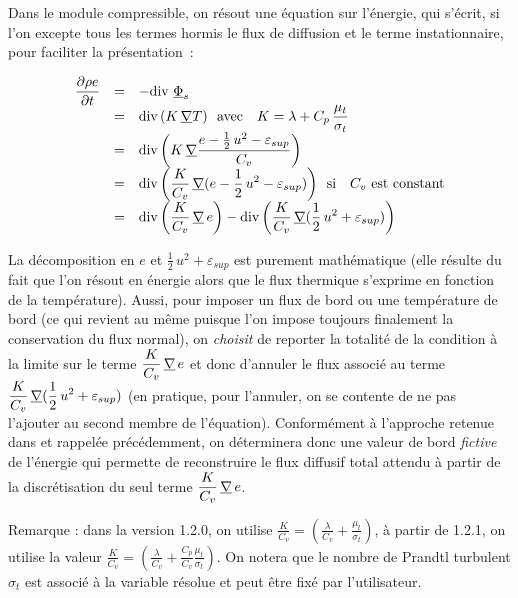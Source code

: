 Dans le module compressible, on résout une équation sur l'énergie, qui s'écrit, si
l'on excepte tous les termes hormis le flux de diffusion et le terme
instationnaire, pour faciliter la présentation~:

\begin{equation}
\begin{array}{lll}
\displaystyle\frac{\partial \rho e}{\partial t} &=& - \text{div}\,{\,\underline{\Phi}_s}\\
&=& \displaystyle\text{div}\,{(K\,\underline{\nabla}{T})} \text{\ \ avec \ \ } K=\lambda+C_p\,\frac{\mu_t}{\sigma_t}\\
&=& \displaystyle\text{div}\,{\left(K\,\underline{\nabla}{\frac{e-\frac{1}{2}\,u^2-\varepsilon_{sup}}{C_v}}\right)} \\
&=& \displaystyle\text{div}\,{\left(\frac{K}{C_v}\,\underline{\nabla}{(e-\frac{1}{2}\,u^2-\varepsilon_{sup})}\right)} \text{\ \
si \ \ } C_v \text{\ est constant}\\
&=& \displaystyle\text{div}\,{\left(\frac{K}{C_v}\,\underline{\nabla}\,e\right)}
-\text{div}\,{\left(\frac{K}{C_v}\,\underline{\nabla}{(\frac{1}{2}\,u^2+\varepsilon_{sup})}\right)} \\

\end{array}
\end{equation}

La décomposition en $e$ et $\frac{1}{2}\,u^2+\varepsilon_{sup}$ est purement
mathématique (elle résulte du fait que l'on résout en énergie alors que
le flux thermique s'exprime en fonction de la température). Aussi,  pour imposer un
flux de bord ou une température de bord (ce qui revient au même puisque l'on
impose toujours finalement la conservation du flux normal), on {\it choisit}
de reporter la totalité de la condition à la limite sur le terme
$\displaystyle\frac{K}{C_v}\,\underline{\nabla}\,e$
et donc d'annuler le flux associé au terme
$\displaystyle\frac{K}{C_v}\,\underline{\nabla}{(\frac{1}{2}\,u^2+\varepsilon_{sup})}$
(en pratique, pour l'annuler, on se contente de ne pas l'ajouter
au second membre de l'équation). Conformément à l'approche retenue dans \CS et
rappelée précédemment, on déterminera donc une valeur de bord {\it
fictive} de l'énergie qui permette de reconstruire le flux diffusif total
attendu à partir
de la discrétisation du seul terme $\displaystyle\frac{K}{C_v}\,\underline{\nabla}\,e$.

Remarque : dans la version 1.2.0,
on utilise $\displaystyle
\frac{K}{C_v}=\left(\frac{\lambda}{C_v}+\frac{\mu_t}{\sigma_t}\right)$, à
partir de 1.2.1, on utilise la valeur  $\displaystyle
\frac{K}{C_v}=\left(\frac{\lambda}{C_v}+\frac{C_p}{C_v}\frac{\mu_t}{\sigma_t}\right)$.
On notera que le nombre de Prandtl turbulent $\sigma_t$ est associé à la variable
résolue et peut être fixé par l'utilisateur.


